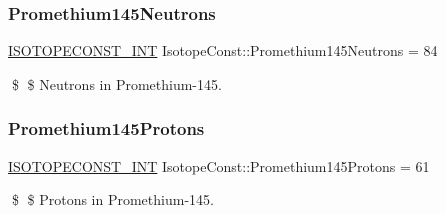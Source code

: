 \subsubsection{\texorpdfstring{Promethium145\+Neutrons}{Promethium145Neutrons}}
{\footnotesize\ttfamily \mbox{\hyperlink{group___isotope_const-_macros_ga5f18360b3e99483a35c32d789e62621c}{I\+S\+O\+T\+O\+P\+E\+C\+O\+N\+S\+T\+\_\+\+I\+NT}} Isotope\+Const\+::\+Promethium145\+Neutrons = 84}

\$ \$ Neutrons in Promethium-\/145. \mbox{\label{group___isotope_const-_promethium-_pm145_ga9ad5c4342ee4c6bae7d90e12e13d7315}} 
\subsubsection{\texorpdfstring{Promethium145\+Protons}{Promethium145Protons}}
{\footnotesize\ttfamily \mbox{\hyperlink{group___isotope_const-_macros_ga5f18360b3e99483a35c32d789e62621c}{I\+S\+O\+T\+O\+P\+E\+C\+O\+N\+S\+T\+\_\+\+I\+NT}} Isotope\+Const\+::\+Promethium145\+Protons = 61}

\$ \$ Protons in Promethium-\/145. 